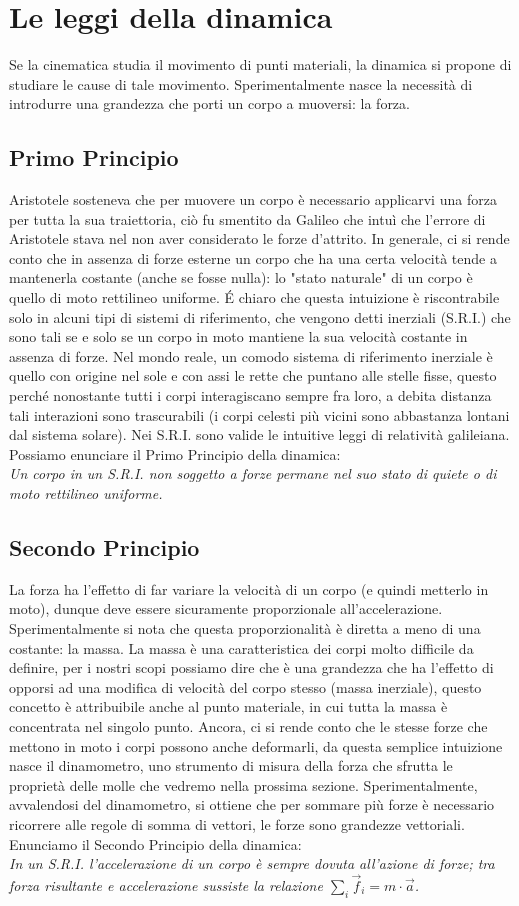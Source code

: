 \documentclass[10pt,a4paper]{article}
\begin{document}
\section{Le leggi della dinamica}
Se la cinematica studia il movimento di punti materiali, la dinamica si propone di studiare le cause di tale movimento. Sperimentalmente nasce la necessità di introdurre una grandezza che porti un corpo a muoversi: la forza. 
\subsection{Primo Principio}
 Aristotele sosteneva che per muovere un corpo è necessario applicarvi una forza per tutta la sua traiettoria, ciò fu smentito da Galileo che intuì che l'errore di Aristotele stava nel non aver considerato le forze d'attrito. In generale, ci si rende conto che in assenza di forze esterne un corpo che ha una certa velocità tende a mantenerla costante (anche se fosse nulla): lo "stato naturale" di un corpo è quello di moto rettilineo uniforme. \'{E} chiaro che questa intuizione è riscontrabile solo in alcuni tipi di sistemi di riferimento, che vengono detti inerziali (S.R.I.) che sono tali se e solo se un corpo in moto mantiene la sua velocità costante in assenza di forze. Nel mondo reale, un comodo sistema di riferimento inerziale è quello con origine nel sole e con assi le rette che puntano alle stelle fisse, questo perché nonostante tutti i corpi interagiscano sempre fra loro, a debita distanza tali interazioni sono trascurabili (i corpi celesti più vicini sono abbastanza lontani dal sistema solare). Nei S.R.I. sono valide le intuitive leggi di relatività galileiana. Possiamo enunciare il Primo Principio della dinamica:\\
 \textit{Un corpo in un S.R.I. non soggetto a forze permane nel suo stato di quiete o di moto rettilineo uniforme.}
 \subsection{Secondo Principio}
 La forza ha l'effetto di far variare la velocità di un corpo (e quindi metterlo in moto), dunque deve essere sicuramente proporzionale all'accelerazione. Sperimentalmente si nota che questa proporzionalità è diretta a meno di una costante: la massa. La massa è una caratteristica dei corpi molto difficile da definire, per i nostri scopi possiamo dire che è una grandezza che ha l'effetto di opporsi ad una modifica di velocità del corpo stesso (massa inerziale), questo concetto è attribuibile anche al punto materiale, in cui tutta la massa è concentrata nel singolo punto. Ancora, ci si rende conto che le stesse forze che mettono in moto i corpi possono anche deformarli, da questa semplice intuizione nasce il dinamometro, uno strumento di misura della forza che sfrutta le proprietà delle molle che vedremo nella prossima sezione. Sperimentalmente, avvalendosi del dinamometro, si ottiene che per sommare più forze è necessario ricorrere alle regole di somma di vettori, le forze sono grandezze vettoriali. Enunciamo il Secondo Principio della dinamica:\\
 \textit{In un S.R.I. l'accelerazione di un corpo è sempre dovuta all'azione di forze; tra forza risultante e accelerazione sussiste la relazione $\sum_{i} \vec{f}_i = m \cdot \vec{a}$.}
\end{document}
